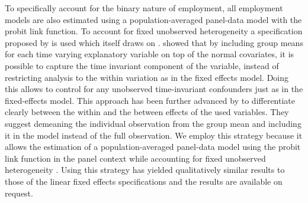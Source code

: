 \documentclass[12pt,english,british]{article}
\begin{document}
To specifically account for the binary nature of employment, all employment
models are also estimated using a population-averaged panel-data model
with the probit link function. To account for fixed unobserved heterogeneity
a specification proposed by \citet{Bell2015} is used which itself
draws on \citet{Mundlak1978}. \citet{Mundlak1978} showed that by
including group means for each time varying explanatory variable on
top of the normal covariates, it is possible to capture the time invariant
component of the variable, instead of restricting analysis to the
within variation as in the fixed effects model. Doing this allows
to control for any unobserved time-invariant confounders just as in
the fixed-effects model. This approach has been further advanced by
\citet{Bell2015} to differentiate clearly between the within and
the between effects of the used variables. They suggest demeaning
the individual observation from the group mean and including it in
the model instead of the full observation. We employ this strategy
because it allows the estimation of a population-averaged panel-data
model using the probit link function in the panel context while accounting
for fixed unobserved heterogeneity \citep{Dieleman2014}. Using this
strategy has yielded qualitatively similar results to those of the
linear fixed effects specifications and the results are available
on request.


\end{document}
